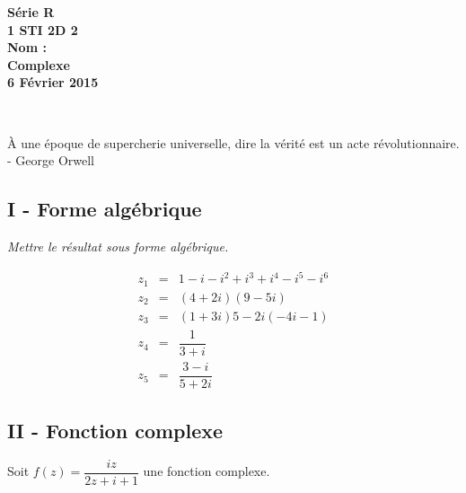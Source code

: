 \documentclass[12pt]{article}
\begin{document}

\begin{minipage}[t]{\textwidth}
  \raggedright
      {\bfseries Série R}\\[.35ex]
      {\bfseries 1 STI 2D 2}\\[.35ex]
      {\bfseries Nom : }\\[.35ex]
      \vspace*{-1cm}
      \raggedleft
          {\bfseries Complexe}\\[.35ex]
          {\bfseries 6 Février 2015}\\[.35ex]
\end{minipage}\\[1em]

\begin{center}
  \textsf{À une époque de supercherie universelle, dire la vérité est un acte révolutionnaire. - George Orwell}\\
\end{center}

\setlength{\columnseprule}{0pt}

\subsection*{I - Forme algébrique}

\textit{Mettre le résultat sous forme algébrique.}

\begin{eqnarray*}
  z_1 &=& 1 - i - i^{2} + i^{3} + i^{4} - i^{5} - i^{6}\\
  z_2 &=& (4+2i)(9-5i)\\
  z_3 &=& (1+3i)5 - 2i(-4i-1)\\
  z_4 &=& \dfrac{1}{3+i}\\
  z_5 &=& \dfrac{3-i}{5+2i}
\end{eqnarray*}

\subsection*{II - Fonction complexe}

Soit $f(z) = \dfrac{i z}{2z + i + 1}$ une fonction complexe.
\end{document}
